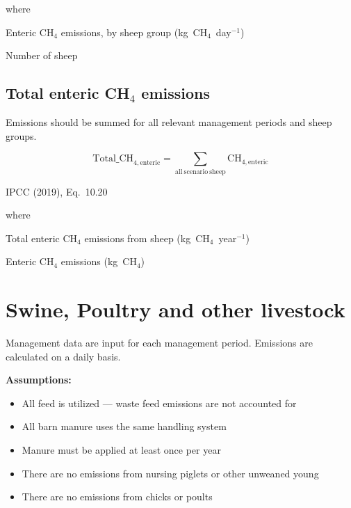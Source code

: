 \noindent where
\begin{description}[font=\normalfont, leftmargin=9em, style=sameline, nosep]
    \item[$\mathrm{CH}_{4,\mathrm{enteric}}$] Enteric CH$_4$ emissions, by sheep
          group (kg~CH$_4$~day$^{-1}$)
    \item[$\#\mathrm{sheep}$] Number of sheep
\end{description}

\subsection{Total enteric CH\texorpdfstring{$_4$}{4} emissions}
\label{subsec:sheep-total}

Emissions should be summed for all relevant management periods and sheep groups.

\begin{equation}
    \mathrm{Total\_CH}_{4,\mathrm{enteric}} =
        \sum_{\mathrm{all\ scenario\ sheep}}
        \mathrm{CH}_{4,\mathrm{enteric}}
    \tag{Eq.\ 3.3.2.1}
\end{equation}

\noindent IPCC (2019), Eq.~10.20

\noindent where
\begin{description}[font=\normalfont, leftmargin=9em, style=sameline, nosep]
    \item[$\mathrm{Total\_CH}_{4,\mathrm{enteric}}$] Total enteric CH$_4$ emissions
          from sheep (kg~CH$_4$~year$^{-1}$)
    \item[$\mathrm{CH}_{4,\mathrm{enteric}}$] Enteric CH$_4$ emissions (kg~CH$_4$)
\end{description}

\section{Swine, Poultry and other livestock}
\label{sec:swine-poultry}

Management data are input for each management period. Emissions are calculated
on a daily basis.

\noindent\textbf{Assumptions:}
\begin{itemize}[leftmargin=1.5em]
    \item All feed is utilized --- waste feed emissions are not accounted for
    \item All barn manure uses the same handling system
    \item Manure must be applied at least once per year
    \item There are no emissions from nursing piglets or other unweaned young
    \item There are no emissions from chicks or poults
\end{itemize}

